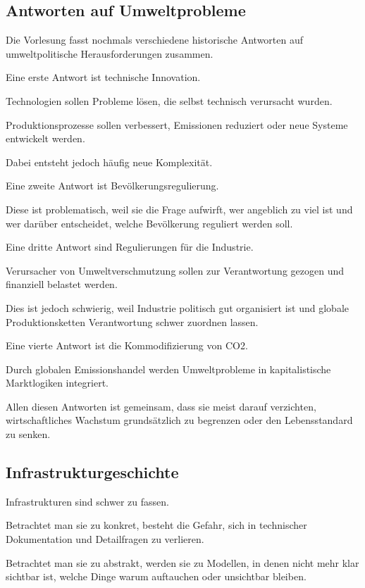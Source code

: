 \subsection{Antworten auf Umweltprobleme}

Die Vorlesung fasst nochmals
verschiedene historische Antworten
auf umweltpolitische Herausforderungen zusammen.

Eine erste Antwort ist technische Innovation.

Technologien sollen Probleme lösen,
die selbst technisch verursacht wurden.

Produktionsprozesse sollen verbessert,
Emissionen reduziert
oder neue Systeme entwickelt werden.

Dabei entsteht jedoch häufig neue Komplexität.

Eine zweite Antwort ist Bevölkerungsregulierung.

Diese ist problematisch,
weil sie die Frage aufwirft,
wer angeblich zu viel ist
und wer darüber entscheidet,
welche Bevölkerung reguliert werden soll.

Eine dritte Antwort sind Regulierungen für die Industrie.

Verursacher von Umweltverschmutzung
sollen zur Verantwortung gezogen
und finanziell belastet werden.

Dies ist jedoch schwierig,
weil Industrie politisch gut organisiert ist
und globale Produktionsketten
Verantwortung schwer zuordnen lassen.

Eine vierte Antwort ist die Kommodifizierung von CO2.

Durch globalen Emissionshandel
werden Umweltprobleme
in kapitalistische Marktlogiken integriert.

Allen diesen Antworten ist gemeinsam,
dass sie meist darauf verzichten,
wirtschaftliches Wachstum grundsätzlich zu begrenzen
oder den Lebensstandard zu senken.

\subsection{Infrastrukturgeschichte}

Infrastrukturen sind schwer zu fassen.

Betrachtet man sie zu konkret,
besteht die Gefahr,
sich in technischer Dokumentation
und Detailfragen zu verlieren.

Betrachtet man sie zu abstrakt,
werden sie zu Modellen,
in denen nicht mehr klar sichtbar ist,
welche Dinge warum auftauchen
oder unsichtbar bleiben.

